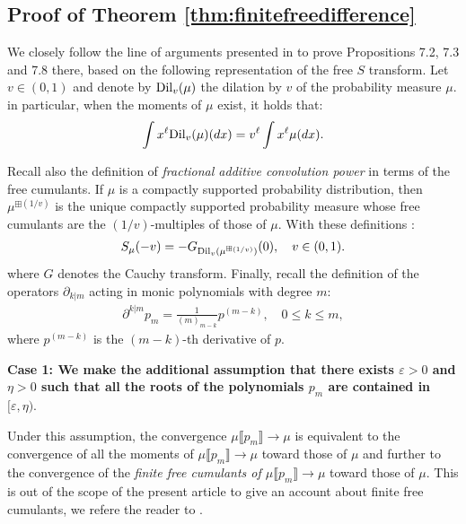 \documentclass[12pt,reqno]{amsart}
\begin{document}
\subsection{Proof of Theorem \ref{thm:finitefreedifference}}    
\label{sec:finitefreediff}
We closely follow the line of arguments presented in \cite{arizmendi2024s} to prove Propositions 7.2, 7.3 and 7.8 there, based on the following representation of the free $S$ transform.
Let $v \in (0,1)$ and denote by ${\rm Dil}_v(\mu)$ the dilation by $v$ of the probability measure $\mu$. in particular, when the moments of $\mu$ exist, it holds that:
\begin{equation*}
         \int x^{\ell} {\rm Dil}_v(\mu)(dx)= v^{\ell}\int x^{\ell} \mu(dx).
\end{equation*}
    
Recall also the definition of \emph{fractional additive convolution power} \cite{shlyakhtenko2020fractional} in terms of the free cumulants. If $\mu$ is a compactly supported probability distribution, then $\mu^{\boxplus (1/v)}$ is the unique compactly supported probability measure whose free cumulants are the $(1/v)$-multiples of those of $\mu$. With these definitions \cite{belinschi2008remarkable}:
\begin{align}
\label{eqn:formulasandg}
S_{\mu}(-v) = -G_{{\rm Dil}_{v}(\mu^{\boxplus ({1}/{v})})}(0), \quad v \in (0,1).
\end{align}
where $G$ denotes the Cauchy transform.
Finally, recall the definition of the operators $\partial_{k|m}$ acting in monic polynomials with degree $m$:
\begin{align}
\label{eqn:formulafreecumulantsderivatives}
\partial^{k|m}p_m = \frac{1}{(m)_{m-k}} p^{(m-k)}, \quad 0 \leq k \leq m,
\end{align}
where $p^{(m-k)}$ is the $(m-k)$-th derivative of $p$.
\newline 

	\textbf{Case 1: We make the additional assumption that there exists $\varepsilon > 0$ and $\eta > 0$ such that all the roots of the polynomials $p_m$ are contained in $[\varepsilon,\eta)$}. \newline

    Under this assumption, the convergence $\mu\llbracket p_m\rrbracket\to\mu$ is equivalent to the convergence of all the moments of $\mu\llbracket p_m\rrbracket\to\mu$ toward those of $\mu$ and further to the convergence of the \emph{finite free cumulants of $\mu\llbracket p_m\rrbracket\to\mu$} toward those of $\mu$. This is out of the scope of the present article to give an account about finite free cumulants, we refere the reader to \cite{arizmendi2018cumulants}.
\end{document}
